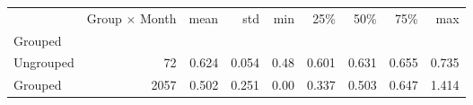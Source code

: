 \begin{tabular}{lrrrrrrrr}
\toprule
{} &  Group $\times$ Month &   mean &    std &   min &    25\% &    50\% &    75\% &    max \\
Grouped   &                       &        &        &       &        &        &        &        \\
\midrule
Ungrouped &                    72 &  0.624 &  0.054 &  0.48 &  0.601 &  0.631 &  0.655 &  0.735 \\
Grouped   &                  2057 &  0.502 &  0.251 &  0.00 &  0.337 &  0.503 &  0.647 &  1.414 \\
\bottomrule
\end{tabular}
